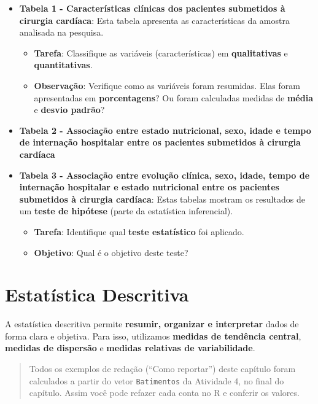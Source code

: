 \documentclass[
]{book}
\providecommand{\tightlist}{%
  \setlength{\itemsep}{0pt}\setlength{\parskip}{0pt}}
\begin{document}
\begin{itemize}
\tightlist
\item
  \textbf{Tabela 1 - Características clínicas dos pacientes submetidos à cirurgia cardíaca}: Esta tabela apresenta as características da amostra analisada na pesquisa.

  \begin{itemize}
  \tightlist
  \item
    \textbf{Tarefa}: Classifique as variáveis (características) em \textbf{qualitativas} e \textbf{quantitativas}.
  \item
    \textbf{Observação}: Verifique como as variáveis foram resumidas. Elas foram apresentadas em \textbf{porcentagens}? Ou foram calculadas medidas de \textbf{média} e \textbf{desvio padrão}?
  \end{itemize}
\item
  \textbf{Tabela 2 - Associação entre estado nutricional, sexo, idade e tempo de internação hospitalar entre os pacientes submetidos à cirurgia cardíaca}\\
\item
  \textbf{Tabela 3 - Associação entre evolução clínica, sexo, idade, tempo de internação hospitalar e estado nutricional entre os pacientes submetidos à cirurgia cardíaca}: Estas tabelas mostram os resultados de um \textbf{teste de hipótese} (parte da estatística inferencial).

  \begin{itemize}
  \tightlist
  \item
    \textbf{Tarefa}: Identifique qual \textbf{teste estatístico} foi aplicado.
  \item
    \textbf{Objetivo}: Qual é o objetivo deste teste?
  \end{itemize}
\end{itemize}

\chapter{Estatística Descritiva}\label{estatuxedstica-descritiva-2}

A estatística descritiva permite \textbf{resumir, organizar e interpretar} dados de forma clara e objetiva. Para isso, utilizamos \textbf{medidas de tendência central}, \textbf{medidas de dispersão} e \textbf{medidas relativas de variabilidade}.

\begin{quote}
Todos os exemplos de redação (``Como reportar'') deste capítulo foram calculados a partir do vetor \texttt{Batimentos} da Atividade 4, no final do capítulo. Assim você pode refazer cada conta no R e conferir os valores.
\end{quote}
\end{document}
